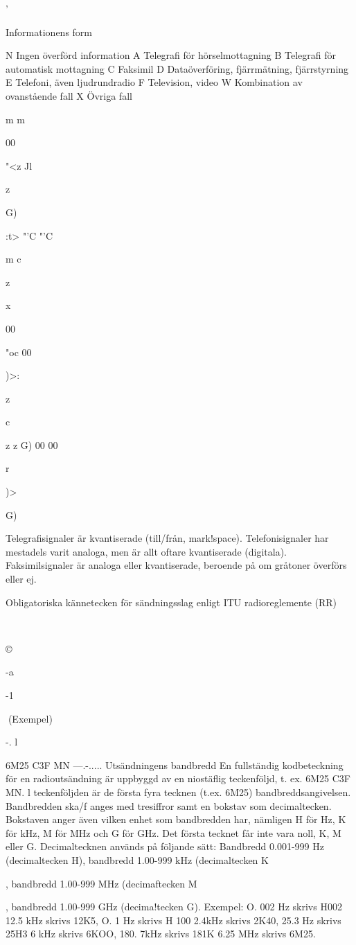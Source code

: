 \documentclass[a4paper,twoside,twocolumn,openright]{book}
\begin{document}
{{{{{{{{{{{{{'

Informationens form

N Ingen överförd information
A Telegrafi
för hörselmottagning
B Telegrafi
för automatisk mottagning
C Faksimil
D Dataöverföring,
fjärrmätning,
fjärrstyrning
E Telefoni,
även ljudrundradio
F Television, video
W Kombination av
ovanstående fall
X Övriga fall

m
m

00

"<z
Jl

z

G)

:t>
"'C
"'C

m
c

z

x

00

"oc
00

)>:

z

c

z
z
G)
00
00

r

)>

G)

Telegrafisignaler är kvantiserade (till/från,
mark!space). Telefonisignaler har mestadels
varit analoga, men är allt oftare kvantiserade
(digitala). Faksimilsignaler är analoga eller
kvantiserade, beroende på om gråtoner överförs eller ej.

Obligatoriska kännetecken
för sändningsslag enligt
ITU radioreglemente (RR)

~

©

-a

-1

(Exempel)

-. l

6M25
C3F MN
---.-.....
Utsändningens bandbredd
En fullständig kodbeteckning för en radioutsändning är uppbyggd av en niostäflig teckenföljd, t. ex.
6M25 C3F MN. l teckenföljden är de första fyra
tecknen (t.ex. 6M25) bandbreddsangivelsen.
Bandbredden ska/f anges med tresiffror samt en
bokstav som decimaltecken.
Bokstaven anger även vilken enhet som bandbredden har, nämligen H för Hz, K för kHz, M för
MHz och G för GHz.
Det första tecknet får inte vara noll, K, M eller G.
Decimaltecknen används på följande sätt:
Bandbredd 0.001-999 Hz (decimaltecken H),
bandbredd 1.00-999 kHz (decimaltecken K},
bandbredd 1.00-999 MHz (decimaftecken M},
bandbredd 1.00-999 GHz (decima!tecken G).
Exempel:
O. 002 Hz skrivs H002
12.5 kHz skrivs 12K5,
O. 1 Hz
skrivs H 100 2.4kHz
skrivs 2K40,
25.3 Hz skrivs 25H3 6 kHz
skrivs 6KOO,
180. 7kHz
skrivs 181K
6.25 MHz
skrivs
6M25.

}}}}}}}}}}}
\end{document}
